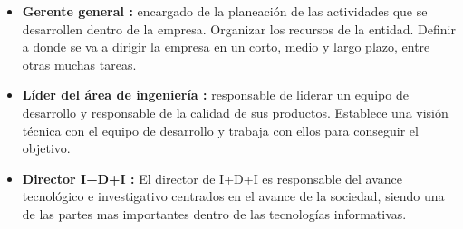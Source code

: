 \begin{itemize}
    \item \textbf{Gerente general :} encargado de la planeación de las actividades que se desarrollen dentro de la empresa. Organizar los recursos de la entidad. Definir a donde se va a dirigir la empresa en un corto, medio y largo plazo, entre otras muchas tareas. 
    
    \item \textbf{Líder del área de ingeniería :}  responsable de liderar un equipo de desarrollo y responsable de la calidad de sus productos. Establece una visión técnica con el equipo de desarrollo y trabaja con ellos para conseguir el objetivo.
    
    \item \textbf{Director I+D+I :}  El director de I+D+I es responsable del avance tecnológico e investigativo centrados en el avance de la sociedad, siendo una de las partes mas importantes dentro de las tecnologías informativas.
\end{itemize}

\begin{adjustbox}{
            center,
            caption=[{Equipo de trabajo.}]{Equipo de trabajo. },
            label={EquipoDeTrabajo},
            nofloat=table, vspace={20px}}
    \end{adjustbox}